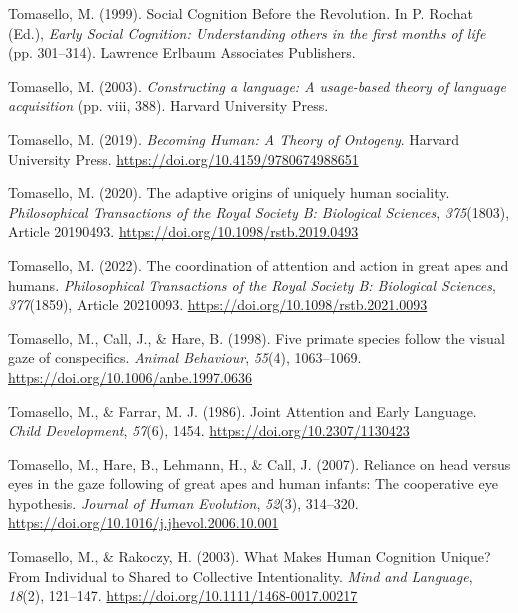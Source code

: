\documentclass[
]{scrbook}
\newlength{\cslhangindent}
\newenvironment{CSLReferences}[2] %
 {\begin{list}{}{%
  \setlength{\itemindent}{0pt}
  \setlength{\leftmargin}{0pt}
  \setlength{\parsep}{0pt}
  \ifodd #1
   \setlength{\leftmargin}{\cslhangindent}
   \setlength{\itemindent}{-1\cslhangindent}
  \fi
  \setlength{\itemsep}{#2\baselineskip}}}
 {\end{list}}
\begin{document}
\begin{CSLReferences}{1}{0}
Tomasello, M. (1999). Social {Cognition Before} the {Revolution}. In P. Rochat (Ed.), \emph{Early {Social Cognition}: {Understanding} others in the first months of life} (pp. 301--314). Lawrence Erlbaum Associates Publishers.

Tomasello, M. (2003). \emph{Constructing a language: {A} usage-based theory of language acquisition} (pp. viii, 388). Harvard University Press.

Tomasello, M. (2019). \emph{Becoming {Human}: {A Theory} of {Ontogeny}}. Harvard University Press. \url{https://doi.org/10.4159/9780674988651}

Tomasello, M. (2020). The adaptive origins of uniquely human sociality. \emph{Philosophical Transactions of the Royal Society B: Biological Sciences}, \emph{375}(1803), Article 20190493. \url{https://doi.org/10.1098/rstb.2019.0493}

Tomasello, M. (2022). The coordination of attention and action in great apes and humans. \emph{Philosophical Transactions of the Royal Society B: Biological Sciences}, \emph{377}(1859), Article 20210093. \url{https://doi.org/10.1098/rstb.2021.0093}

Tomasello, M., Call, J., \& Hare, B. (1998). Five primate species follow the visual gaze of conspecifics. \emph{Animal Behaviour}, \emph{55}(4), 1063--1069. \url{https://doi.org/10.1006/anbe.1997.0636}

Tomasello, M., \& Farrar, M. J. (1986). Joint {Attention} and {Early Language}. \emph{Child Development}, \emph{57}(6), 1454. \url{https://doi.org/10.2307/1130423}

Tomasello, M., Hare, B., Lehmann, H., \& Call, J. (2007). Reliance on head versus eyes in the gaze following of great apes and human infants: The cooperative eye hypothesis. \emph{Journal of Human Evolution}, \emph{52}(3), 314--320. \url{https://doi.org/10.1016/j.jhevol.2006.10.001}

Tomasello, M., \& Rakoczy, H. (2003). What {Makes Human Cognition Unique}? {From Individual} to {Shared} to {Collective Intentionality}. \emph{Mind and Language}, \emph{18}(2), 121--147. \url{https://doi.org/10.1111/1468-0017.00217}


\end{CSLReferences}
\end{document}
